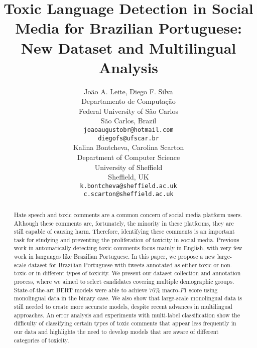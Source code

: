 \documentclass[11pt,a4paper]{article}
\title{Toxic Language Detection in Social Media for Brazilian Portuguese:\\ New Dataset and Multilingual Analysis}
\author{João A. Leite, Diego F. Silva \\
  Departamento de Computação \\
  Federal University of São Carlos \\
  São Carlos, Brazil \\
  \texttt{joaoaugustobr@hotmail.com} \\
  \texttt{diegofs@ufscar.br} \\ \And
  Kalina Bontcheva, Carolina Scarton \\
  Department of Computer Science \\
  University of Sheffield \\
  Sheffield, UK \\
  \texttt{k.bontcheva@sheffield.ac.uk} \\
  \texttt{c.scarton@sheffield.ac.uk}\\}
\date{}
\begin{document}
\maketitle
\begin{abstract}
Hate speech and toxic comments are a common concern of social media platform users. Although these comments are, fortunately, the minority in these platforms, they are still capable of causing harm. Therefore, identifying these comments is an important task for studying and preventing the proliferation of toxicity in social media. Previous work in automatically detecting toxic comments focus mainly in English, with very few work in languages like Brazilian Portuguese. In this paper, we propose a new large-scale dataset for Brazilian Portuguese with tweets annotated as either toxic or non-toxic or in different types of toxicity. We present our dataset collection and annotation process, where we aimed to select candidates covering multiple demographic groups. State-of-the-art BERT models were able to achieve 76\% macro-$F1$ score using monolingual data in the binary case. We also show that large-scale monolingual data is still needed to create more accurate models, despite recent advances in multilingual approaches. An error analysis and experiments with multi-label classification show the difficulty of classifying certain types of toxic comments that appear less frequently in our data and highlights the need to develop models that are aware of different categories of toxicity. 
\end{abstract}
\end{document}
